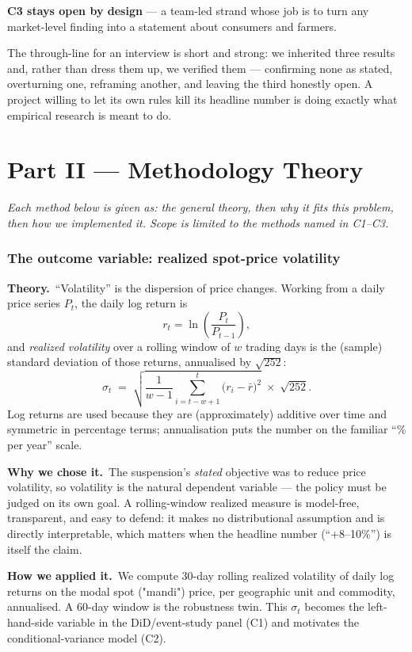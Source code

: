 \documentclass[11pt]{article}
\newcommand{\why}{\smallskip\noindent\textbf{Why we chose it.}\ }
\newcommand{\how}{\smallskip\noindent\textbf{How we applied it.}\ }
\newcommand{\thy}{\noindent\textbf{Theory.}\ }
\begin{document}
\smallskip\noindent\textbf{C3 stays open by design} --- a team-led strand whose job is to turn
any market-level finding into a statement about consumers and farmers.

\smallskip\noindent The through-line for an interview is short and strong: we inherited three
results and, rather than dress them up, we verified them --- confirming none as stated,
overturning one, reframing another, and leaving the third honestly open. A project willing to
let its own rules kill its headline number is doing exactly what empirical research is meant
to do.

\part*{Part II --- Methodology Theory}
\noindent\emph{Each method below is given as: the general theory, then why it fits this
problem, then how we implemented it. Scope is limited to the methods named in C1--C3.}

\section{The outcome variable: realized spot-price volatility}
\thy ``Volatility'' is the dispersion of price changes. Working from a daily price series
$P_t$, the daily log return is
\[
  r_t = \ln\!\left(\frac{P_t}{P_{t-1}}\right),
\]
and \emph{realized volatility} over a rolling window of $w$ trading days is the (sample)
standard deviation of those returns, annualised by $\sqrt{252}$:
\[
  \sigma_t \;=\; \sqrt{\frac{1}{w-1}\sum_{i=t-w+1}^{t}\big(r_i-\bar r\big)^2}\;\times\;\sqrt{252}.
\]
Log returns are used because they are (approximately) additive over time and symmetric in
percentage terms; annualisation puts the number on the familiar ``\% per year'' scale.

\why The suspension's \emph{stated} objective was to reduce price volatility, so volatility
is the natural dependent variable --- the policy must be judged on its own goal. A
rolling-window realized measure is model-free, transparent, and easy to defend: it makes no
distributional assumption and is directly interpretable, which matters when the headline
number (``+8--10\%'') is itself the claim.

\how We compute 30-day rolling realized volatility of daily log returns on the modal spot
("mandi") price, per geographic unit and commodity, annualised. A 60-day window is the
robustness twin. This $\sigma_t$ becomes the left-hand-side variable in the DiD/event-study
panel (C1) and motivates the conditional-variance model (C2).
\end{document}
